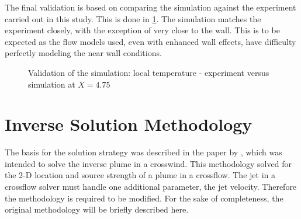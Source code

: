 \documentclass[preprint,12pt]{elsarticle}
\begin{document}
%	

The final validation is based on comparing the simulation against the experiment carried out in this study.  This is done in \cref{fig:jetexp15}.  The simulation matches the experiment closely, with the exception of very close to the wall.  This is to be expected as the flow models used, even with enhanced wall effects, have difficulty perfectly modeling the near wall conditions.
\begin{figure}[!htbp]
	\centering
	\setlength\figureheight{5cm} 
	\setlength\figurewidth{5cm}
	
	\caption{Validation of the simulation: local temperature - experiment versus simulation at $X=4.75$}
	\label{fig:jetexp15}
\end{figure}

\section{Inverse Solution Methodology}
The basis for the solution strategy was described in the paper by \citet{ijhmt1}, which was intended to solve the inverse plume in a crosswind.  This methodology solved for the 2-D location and source strength of a plume in a crossflow.  The jet in a crossflow solver must handle one additional parameter, the jet velocity.  Therefore the methodology is required to be modified.  For the sake of completeness, the original methodology will be briefly described here.
\end{document}
